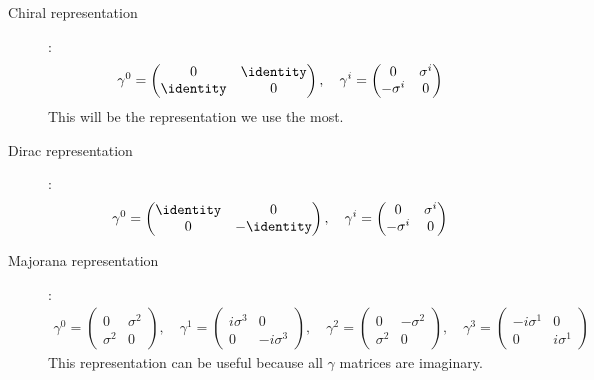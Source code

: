 \documentclass{jknotes} %
\begin{document}
\begin{description}
    \item[Chiral representation]:
        \begin{align}
            \gamma^0 = 
            \begin{pmatrix}
                0 & \identity \\
                \identity & 0
            \end{pmatrix},\quad
            \gamma^i =
            \begin{pmatrix}
                0 & \sigma^i \\
                -\sigma^i & 0
            \end{pmatrix}
        \end{align}
        This will be the representation we use the most.
    \item[Dirac representation]:
        \begin{align}
            \gamma^0 = 
            \begin{pmatrix}
                \identity & 0 \\
                0 & -\identity
            \end{pmatrix},\quad
            \gamma^i =
            \begin{pmatrix}
                0 & \sigma^i \\
                -\sigma^i & 0
            \end{pmatrix}
        \end{align}
    \item[Majorana representation]:
        \begin{align}
            \gamma^0 =
            \begin{pmatrix}
                0 & \sigma^2 \\
                \sigma^2 & 0
            \end{pmatrix},\quad
            \gamma^1 =
            \begin{pmatrix}
                i\sigma^3 & 0 \\
                0 & -i\sigma^3
            \end{pmatrix},\quad
            \gamma^2 =
            \begin{pmatrix}
                0 & -\sigma^2 \\
                \sigma^2 & 0
            \end{pmatrix},\quad
            \gamma^3 =
            \begin{pmatrix}
                -i\sigma^1 & 0 \\
                0 & i\sigma^1
            \end{pmatrix}
        \end{align}
        This representation can be useful because all \(\gamma\) matrices are imaginary.
\end{description}
\end{document}
